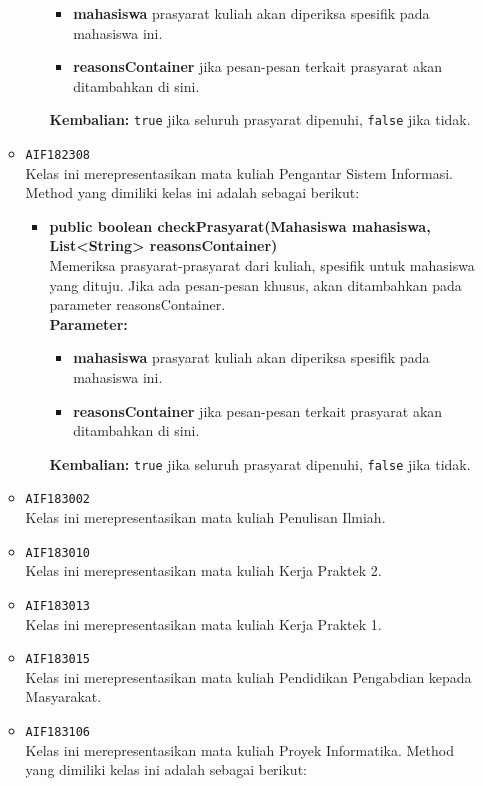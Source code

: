 \begin{enumerate}
\begin{itemize}
\begin{itemize}
\begin{itemize}
\item \textbf{mahasiswa} prasyarat kuliah akan diperiksa spesifik pada mahasiswa ini.
\item \textbf{reasonsContainer} jika pesan-pesan terkait prasyarat akan ditambahkan di sini.
\end{itemize}
\textbf{Kembalian:} \texttt{true} jika seluruh prasyarat dipenuhi, \texttt{false} jika tidak.
\end{itemize}
\item \texttt{AIF182308} \\
Kelas ini merepresentasikan mata kuliah Pengantar Sistem Informasi. Method yang dimiliki kelas ini adalah sebagai berikut: 
\begin{itemize}
\item \textbf{public boolean checkPrasyarat(Mahasiswa mahasiswa, List<String> reasonsContainer)}\\
Memeriksa prasyarat-prasyarat dari kuliah, spesifik untuk mahasiswa yang dituju. Jika ada pesan-pesan khusus, akan ditambahkan pada parameter reasonsContainer.\\
\textbf{Parameter:}
\begin{itemize}
\item \textbf{mahasiswa} prasyarat kuliah akan diperiksa spesifik pada mahasiswa ini.
\item \textbf{reasonsContainer} jika pesan-pesan terkait prasyarat akan ditambahkan di sini.
\end{itemize}
\textbf{Kembalian:} \texttt{true} jika seluruh prasyarat dipenuhi, \texttt{false} jika tidak.
\end{itemize}
\item \texttt{AIF183002} \\
Kelas ini merepresentasikan mata kuliah Penulisan Ilmiah.
\item \texttt{AIF183010} \\
Kelas ini merepresentasikan mata kuliah Kerja Praktek 2.
\item \texttt{AIF183013} \\
Kelas ini merepresentasikan mata kuliah Kerja Praktek 1.
\item \texttt{AIF183015} \\
Kelas ini merepresentasikan mata kuliah Pendidikan Pengabdian kepada Masyarakat.
\item \texttt{AIF183106} \\
Kelas ini merepresentasikan mata kuliah Proyek Informatika. Method yang dimiliki kelas ini adalah sebagai berikut: 

\end{itemize}
\end{enumerate}
